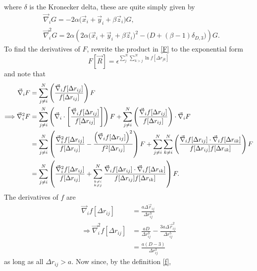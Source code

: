 \documentclass[a4paper,8pt]{article}
\begin{document}
where $\delta$ is the Kronecker delta, these are quite simply given by
\begin{align}
&\vec{\nabla}_i G = -2\alpha\Big(\vec{x}_i+\vec{y}_i+\beta\vec{z}_i\Big)G, \label{grad_G}\\
&\vec{\nabla}_i^2G = 2\alpha\left(2\alpha\Big(\vec{x}_i+\vec{y}_i+\beta\vec{z}_i\Big)^2-\Big(D+(\beta-1)\delta_{D,3}\Big)\right)G. \label{Lap_G}
\end{align}
To find the derivatives of $F$, rewrite the product in \eqref{F} to the exponential form 
\begin{equation}
F[\vec{R}] = \epsilon^{\sum\limits_{j}^N\sum\limits_{k > j}^N \ln f[\Delta{r}_{jk}]}
\end{equation}
and note that
\begin{align}
\vec{\nabla}_i F &= \sum\limits_{j \neq i}^N \left(\frac{\vec{\nabla}_i f[\Delta{r}_{ij}]}{f[\Delta{r}_{ij}]}\right) F \nonumber\\
\Longrightarrow \vec{\nabla}_i^2 F &= \sum\limits_{j \neq i}^N \left(\vec{\nabla}_i\cdot\left[\frac{\vec{\nabla}_i f[\Delta{r}_{ij}]}{f[\Delta{r}_{ij}]}\right]\right) F + \sum\limits_{j \neq i}^N \left(\frac{\vec{\nabla}_i f[\Delta{r}_{ij}]}{f[\Delta{r}_{ij}]}\right)\cdot \vec{\nabla}_i F \nonumber\\
&= \sum\limits_{j \neq i}^N \left(\frac{\vec{\nabla}_i^2 f[\Delta{r}_{ij}]}{f[\Delta{r}_{ij}]} - \frac{\left(\vec{\nabla}_i f[\Delta{r}_{ij}]\right)^2}{f^2[\Delta{r}_{ij}]}\right) F + \sum\limits_{j \neq i}^N \sum\limits_{k \neq i}^N \left(\frac{\vec{\nabla}_i f[\Delta{r}_{ij}] \cdot\vec{\nabla}_i f[\Delta{r}_{ik}]}{f[\Delta{r}_{ij}]f[\Delta{r}_{ik}]}\right) F \nonumber\\
&= \sum\limits_{j \neq i}^N \left(\frac{\vec{\nabla}_i^2 f[\Delta{r}_{ij}]}{f[\Delta{r}_{ij}]} + \sum\limits_{{k \neq i}\atop{k \neq j}}^N \frac{\vec{\nabla}_i f[\Delta{r}_{ij}] \cdot\vec{\nabla}_i f[\Delta{r}_{ik}]}{f[\Delta{r}_{ij}]f[\Delta{r}_{ik}]}\right) F. \nonumber
\end{align}
The derivatives of $f$ are
\begin{align}
\vec{\nabla}_i f[\Delta{r}_{ij}] &= \frac{a\Delta\vec{r}_{ij}}{\Delta{r}_{ij}^3} \\
\Longrightarrow \vec{\nabla}_i^2 f[\Delta{r}_{ij}] &= \frac{aD}{\Delta{r}_{ij}^3}-\frac{3a\Delta\vec{r}_{ij}^2}{\Delta{r}_{ij}^5} \nonumber\\
&= \frac{a(D-3)}{\Delta{r}_{ij}^3}
\end{align}
as long as all $\Delta{r}_{ij} > a$. Now since, by the definition \eqref{f}, 
\end{document}
